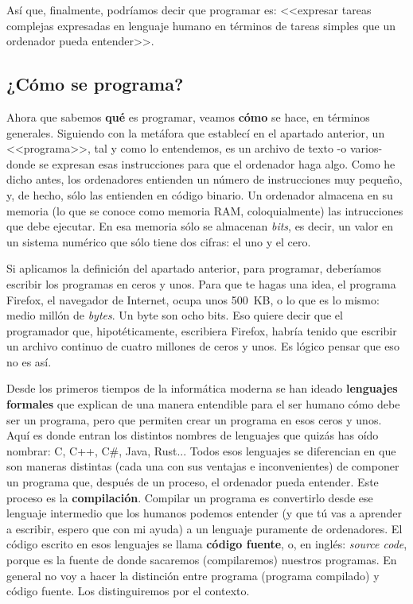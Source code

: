 \documentclass[a4paper]{article}
\begin{document}
Así que, finalmente, podríamos decir que programar es: <<expresar tareas
complejas expresadas en lenguaje humano en términos de
tareas simples que un ordenador pueda entender>>.

\subsection{¿Cómo se programa?}
Ahora que sabemos \textbf{qué} es programar, veamos \textbf{cómo}
se hace, en términos generales. Siguiendo con la metáfora que establecí en el
apartado anterior, un <<programa>>, tal y como lo entendemos, es un archivo de
texto -o varios- donde se expresan esas instrucciones para que el ordenador
haga algo. Como he dicho antes, los ordenadores entienden un número de
instrucciones muy pequeño, y, de hecho, sólo las entienden en código binario. Un
ordenador almacena en su memoria (lo que se conoce como memoria RAM,
coloquialmente) las intrucciones que debe ejecutar.
En esa memoria sólo se almacenan \textit{bits}, es decir, un valor en un
sistema numérico que sólo tiene dos cifras: el uno y el cero.

Si aplicamos la definición del apartado anterior, para programar, deberíamos
escribir los programas en ceros y unos. Para que te hagas una idea,
el programa Firefox, el navegador de Internet, ocupa unos 500~KB, o lo que
es lo mismo: medio millón de \textit{bytes}. Un byte son ocho bits. Eso quiere
decir que el programador que, hipotéticamente, escribiera Firefox, habría tenido
que escribir un archivo continuo de cuatro millones de ceros y unos. Es lógico
pensar que eso no es así.

Desde los primeros tiempos de la informática moderna se han ideado
\textbf{lenguajes formales} que explican de una manera entendible para el ser
humano cómo debe ser un programa, pero que permiten crear un programa en esos
ceros y unos. Aquí es donde entran los distintos nombres de lenguajes que
quizás has oído nombrar: C, C++, C\#, Java, Rust...
Todos esos lenguajes se diferencian en que son maneras distintas (cada una con
sus ventajas e inconvenientes) de componer un programa que, después de un
proceso, el ordenador pueda entender. Este proceso es la \textbf{compilación}.
Compilar un programa es convertirlo desde ese lenguaje intermedio que los
humanos podemos entender (y que tú vas a aprender a escribir, espero que con mi
ayuda) a un lenguaje puramente de ordenadores. El código escrito en esos
lenguajes se llama \textbf{código fuente}, o, en inglés: \textit{source code},
porque es la fuente de donde sacaremos (compilaremos) nuestros programas. En
general no voy a hacer la distinción entre programa (programa compilado) y
código fuente. Los distinguiremos por el contexto.
\end{document}
